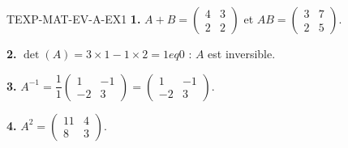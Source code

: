 %
\begin{corrige}{TEXP-MAT-EV-A-EX1}
\textbf{1.} $A+B=\begin{pmatrix}4&3\\2&2\end{pmatrix}$ et $AB=\begin{pmatrix}3&7\\2&5\end{pmatrix}$.

\textbf{2.} $\det(A)=3\times1-1\times2=1
eq0$ : $A$ est inversible.

\textbf{3.} $A^{-1}=\dfrac{1}{1}\begin{pmatrix}1&-1\\-2&3\end{pmatrix}=\begin{pmatrix}1&-1\\-2&3\end{pmatrix}$.

\textbf{4.} $A^2=\begin{pmatrix}11&4\\8&3\end{pmatrix}$.
\end{corrige}

